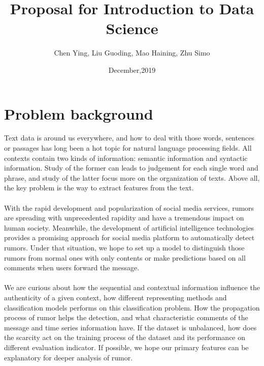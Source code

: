 \documentclass{article}
\title{\bf Proposal for Introduction to Data Science}
\author{Chen Ying, Liu Guoding, Mao Haining, Zhu Simo}
\date{December,2019}
\begin{document}
\maketitle

\section{Problem background}
Text data is around us everywhere, and how to deal with those words, sentences or passages has long been a hot topic for natural language processing fields. All contexts contain two kinds of information: semantic information and syntactic information. Study of the former can leads to judgement for each single word and phrase, and study of the latter focus more on the organization of texts. Above all, the key problem is the way to extract features from the text.
\\ \hspace*{\fill} \\
With the rapid development and popularization of social media services, rumors are spreading with unprecedented rapidity and have a tremendous impact on human society. Meanwhile, the development of artificial intelligence technologies provides a promising approach for social media platform to automatically detect rumors. Under that situation, we hope to set up a model to distinguish those rumors from normal ones with only contents or make predictions based on all comments when users forward the message.
\\ \hspace*{\fill} \\
We are curious about how the sequential and contextual information influence the authenticity of a given context, how different representing methods and classification models performs on this classification problem. How the propagation process of rumor helps the detection, and what characteristic comments of the message and time series information have. If the dataset is unbalanced, how does the scarcity act on the training process of the dataset and its performance on different evaluation indicator. If possible, we hope our primary features can be explanatory for deeper analysis of rumor. 
\end{document}
